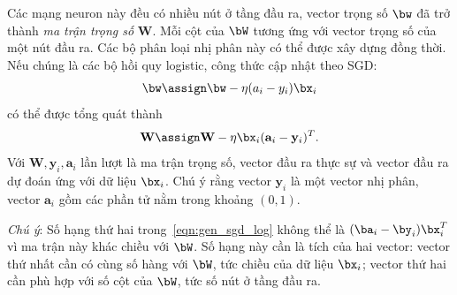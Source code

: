 Các mạng neuron này đều có nhiều nút ở tầng đầu ra, vector trọng số
$\bw$ đã trở thành \textit{ma trận trọng số} $\mathbf{W}$. Mỗi
cột của $\bW$ tương ứng với vector trọng số của một nút đầu ra. Các bộ phân loại nhị phân này có thể được xây dựng đồng thời. Nếu chúng là các bộ hồi quy logistic, công thức cập nhật theo SGD:
\begin{equation} 
\bw \assign \bw - \eta(a_i - y_i)\bx_i 
\end{equation} 
có thể được tổng quát thành
\begin{equation} 
\label{eqn:gen_sgd_log}
\mathbf{W} \assign \mathbf{W} - \eta\bx_i(\mathbf{a}_i - \mathbf{y}_i)^T.
\end{equation} 
 Với $\mathbf{W}, \mathbf{y}_i, \mathbf{a}_i$ lần lượt là ma trận trọng số,
vector đầu ra thực sự và vector đầu ra dự đoán ứng với dữ liệu $\bx_i$. Chú ý
rằng vector $\mathbf{y}_i$ là một vector nhị phân, vector $\mathbf{a}_i$ gồm các
phần tử nằm trong khoảng $(0, 1)$.


\textit{Chú ý}: Số hạng thứ hai trong~\eqref{eqn:gen_sgd_log} không thể là $(\ba_i - \by_i)\bx_i^T$ vì ma trận này khác chiều với $\bW$. Số hạng này cần là tích của hai vector: vector thứ nhất cần có cùng số hàng với $\bW$, tức chiều của dữ liệu $\bx_i$; vector thứ hai cần phù hợp với số cột của $\bW$, tức số nút ở tầng đầu ra. 

 
 
 
 

 
